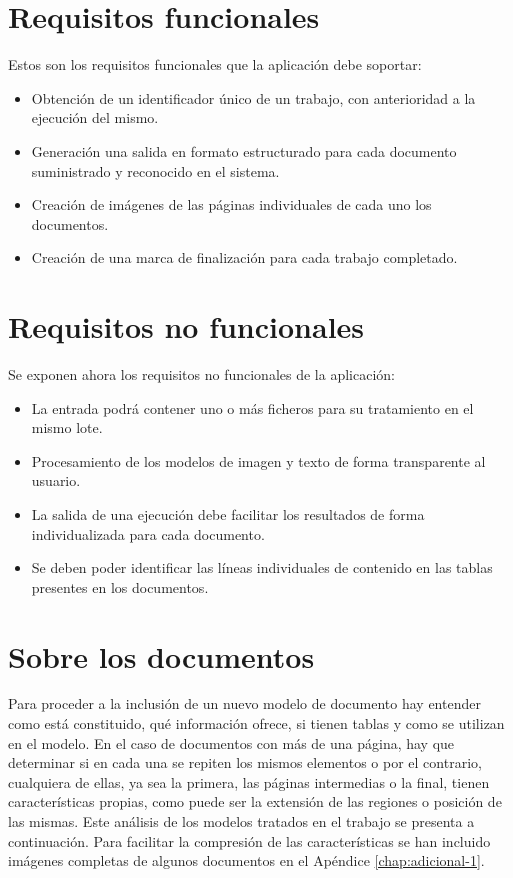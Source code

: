 \section{Requisitos funcionales}

Estos son los requisitos funcionales que la aplicación debe soportar:

\begin{itemize}
	\item Obtención de un identificador único de un trabajo, con anterioridad a la ejecución del mismo.
	\item Generación una salida en formato estructurado para cada documento suministrado y reconocido en el sistema.
	\item Creación de imágenes de las páginas individuales de cada uno los documentos.
	\item Creación de una marca de finalización para cada trabajo completado.
\end{itemize}


\section{Requisitos no funcionales}

Se exponen ahora los requisitos no funcionales de la aplicación:

\begin{itemize}
	\item La entrada podrá contener uno o más ficheros para su tratamiento en el mismo lote.
	\item Procesamiento de los modelos de imagen y texto de forma transparente al usuario.
	\item La salida de una ejecución debe facilitar los resultados de forma individualizada para cada documento.
	\item Se deben poder identificar las líneas individuales de contenido en  las tablas presentes en los documentos.
\end{itemize}

\section{Sobre los documentos}
\label{sec:sobre-los-documentos}

Para proceder a la inclusión de un nuevo modelo de documento hay entender como está constituido, qué información ofrece, si tienen tablas y como se utilizan en el modelo. En el caso de documentos con más de una página, hay que determinar si en cada una se repiten los mismos elementos o por el contrario, cualquiera de ellas, ya sea la primera, las páginas intermedias o la final, tienen características propias, como puede ser la extensión de las regiones o posición de las mismas. Este análisis de los modelos tratados en el trabajo se presenta a continuación. Para facilitar la compresión de las características se han incluido imágenes completas de algunos documentos en el Apéndice \ref{chap:adicional-1}.

